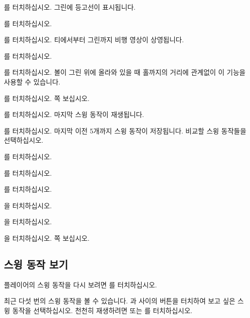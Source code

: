 \documentclass[10pt, openright, language=korean]{hzguide}
\begin{document}
를 터치하십시오. 그린에 등고선이 표시됩니다.

를 터치하십시오.

를 터치하십시오. 티에서부터 그린까지 비행 영상이 상영됩니다.

 를 터치하십시오.

를 터치하십시오. 볼이 그린 위에 올라와 있을 때 홀까지의 거리에 관계없이 이 기능을 사용할 수 있습니다.

를 터치하십시오. \pageref{sec:score_card} 쪽 \를 보십시오.

를 터치하십시오. 마지막 스윙 동작이 재생됩니다.

 를 터치하십시오. 마지막 이전 5개까지 스윙 동작이 저장됩니다. 
 비교할 스윙 동작들을 선택하십시오.

 를 터치하십시오.

를 터치하십시오.

를 터치하십시오.

 을 터치하십시오.

을 터치하십시오.

을 터치하십시오. 
\pageref{sec:troubleshooting} 쪽 \을 보십시오.

\subsection{스윙 동작 보기}

플레이어의 스윙 동작을 다시 보려면 를 터치하십시오.


최근 다섯 번의 스윙 동작을 볼 수 있습니다.
과  사이의 버튼을 터치하여 보고 싶은 스윙 동작을 선택하십시오.
천천히 재생하려면  또는 를 터치하십시오.
\end{document}
